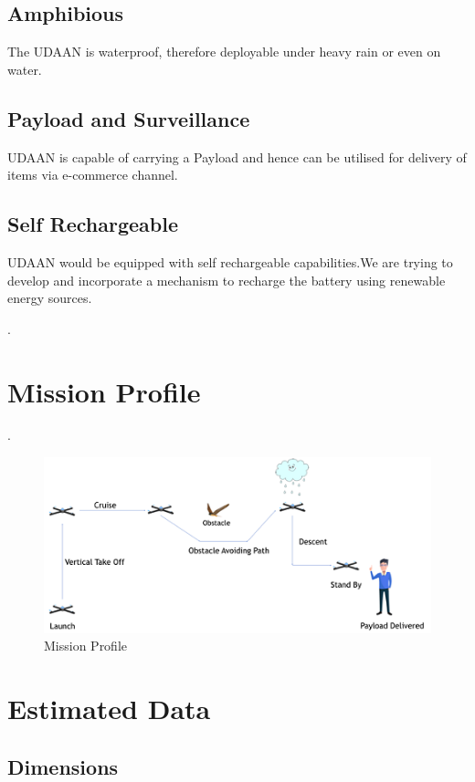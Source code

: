 \documentclass[8pt]{report}
\begin{document}
\subsection{Amphibious}

The UDAAN is waterproof, therefore deployable under heavy rain or even on water.

\subsection{Payload and Surveillance}

UDAAN is capable of carrying a Payload and hence can be utilised for delivery of items via e-commerce channel.


\subsection{Self Rechargeable}

UDAAN would be equipped with self rechargeable capabilities.We are trying to develop and incorporate a mechanism to recharge the battery using renewable energy sources. 

.


\clearpage
\section{Mission Profile} .

\begin{figure}[h!]
\centering
\includegraphics[width=1.1\textwidth]{mission_profile.png} 
\caption{\label{fig:mission_profile}Mission Profile}
\end{figure}


\section{Estimated Data}

\subsection{Dimensions}
\end{document}
